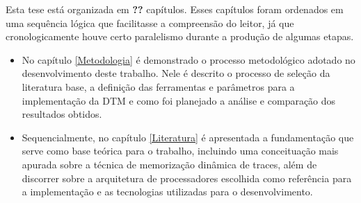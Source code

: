 
Esta tese está organizada em \textbf{??} capítulos. Esses capítulos foram ordenados em uma sequência lógica que facilitasse a compreensão do leitor, já que cronologicamente houve certo paralelismo durante a produção de algumas etapas.

\begin{itemize}


	\item No capítulo \ref{Metodologia} é demonstrado o processo metodológico adotado no desenvolvimento deste trabalho. Nele é descrito o processo de seleção da literatura base, a definição das ferramentas e parâmetros para a implementação da DTM e como foi planejado a análise e comparação dos resultados obtidos.

	\item Sequencialmente, no capítulo \ref{Literatura} é apresentada a fundamentação que serve como base teórica para o trabalho, incluindo uma conceituação mais apurada sobre a técnica de memorização dinâmica de traces, além de discorrer sobre a arquitetura de processadores escolhida como referência para a implementação e as tecnologias utilizadas para o desenvolvimento.
	


\end{itemize}
